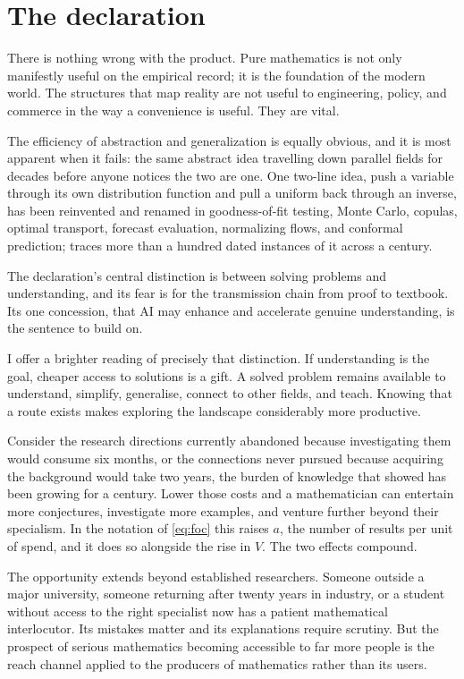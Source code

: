 \documentclass[11pt]{article}
\theoremstyle{definition}
\theoremstyle{remark}
\begin{document}
\section{The declaration}

There is nothing wrong with the product. Pure mathematics is not only manifestly useful on the empirical record; it is the foundation of the modern world. The structures that map reality are not useful to engineering, policy, and commerce in the way a convenience is useful. They are vital.

The efficiency of abstraction and generalization is equally obvious, and it is most apparent when it fails: the same abstract idea travelling down parallel fields for decades before anyone notices the two are one. One two-line idea, push a variable through its own distribution function and pull a uniform back through an inverse, has been reinvented and renamed in goodness-of-fit testing, Monte Carlo, copulas, optimal transport, forecast evaluation, normalizing flows, and conformal prediction; \citet{cotton2026skaters} traces more than a hundred dated instances of it across a century.

The declaration's central distinction is between solving problems and understanding, and its fear is for the transmission chain from proof to textbook. Its one concession, that AI may enhance and accelerate genuine understanding, is the sentence to build on.

I offer a brighter reading of precisely that distinction. If understanding is the goal, cheaper access to solutions is a gift. A solved problem remains available to understand, simplify, generalise, connect to other fields, and teach. Knowing that a route exists makes exploring the landscape considerably more productive.

Consider the research directions currently abandoned because investigating them would consume six months, or the connections never pursued because acquiring the background would take two years, the burden of knowledge that \citet{jones2009} showed has been growing for a century. Lower those costs and a mathematician can entertain more conjectures, investigate more examples, and venture further beyond their specialism. In the notation of \eqref{eq:foc} this raises $a$, the number of results per unit of spend, and it does so alongside the rise in $V$. The two effects compound.

The opportunity extends beyond established researchers. Someone outside a major university, someone returning after twenty years in industry, or a student without access to the right specialist now has a patient mathematical interlocutor. Its mistakes matter and its explanations require scrutiny. But the prospect of serious mathematics becoming accessible to far more people is the reach channel applied to the producers of mathematics rather than its users.
\end{document}
